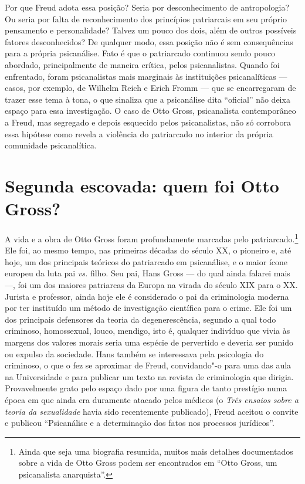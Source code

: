Por que Freud adota essa posição? Seria por desconhecimento de
antropologia? Ou seria por falta de reconhecimento dos princípios
patriarcais em seu próprio pensamento e personalidade? Talvez um pouco
dos dois, além de outros possíveis fatores desconhecidos? De qualquer
modo, essa posição não é sem consequências para a própria psicanálise.
Fato é que o patriarcado continuou sendo pouco abordado, principalmente
de maneira crítica, pelos psicanalistas. Quando foi enfrentado, foram
psicanalistas mais marginais às instituições psicanalíticas --- casos,
por exemplo, de Wilhelm Reich e Erich Fromm --- que se encarregaram de
trazer esse tema à tona, o que sinaliza que a psicanálise dita
``oficial'' não deixa espaço para essa investigação. O caso de Otto
Gross, psicanalista contemporâneo a Freud, mas segregado e depois
esquecido pelos psicanalistas, não só corrobora essa hipótese como
revela a violência do patriarcado no interior da própria comunidade
psicanalítica.

\section{Segunda escovada: quem foi Otto Gross? }

A vida e a obra de Otto Gross foram profundamente marcadas pelo
patriarcado.\footnote{Ainda que seja uma biografia resumida, muitos mais
  detalhes documentados sobre a vida de Otto Gross podem ser encontrados
  em ``Otto Gross, um psicanalista anarquista''.} Ele foi, ao mesmo
tempo, nas primeiras décadas do século XX, o pioneiro e, até hoje, um
dos principais teóricos do patriarcado em psicanálise, e o maior ícone
europeu da luta pai \emph{vs.} filho. Seu pai, Hans Gross --- do qual
ainda falarei mais ---, foi um dos maiores patriarcas da Europa na virada
do século XIX para o XX. Jurista e professor, ainda hoje ele é
considerado o pai da criminologia moderna por ter instituído um método
de investigação científica para o crime. Ele foi um dos principais
defensores da teoria da degenerescência, segundo a qual todo criminoso,
homossexual, louco, mendigo, isto é, qualquer indivíduo que vivia às
margens dos valores morais seria uma espécie de pervertido e deveria ser
punido ou expulso da sociedade. Hans também se interessava pela
psicologia do criminoso, o que o fez se aproximar de Freud, convidando"-o
para uma das aula na Universidade e para publicar um texto na revista de
criminologia que dirigia. Provavelmente grato pelo espaço dado por uma
figura de tanto prestígio numa época em que ainda era duramente atacado
pelos médicos (o \emph{Três ensaios sobre a teoria da sexualidade} havia
sido recentemente publicado), Freud aceitou o convite e publicou
``Psicanálise e a determinação dos fatos nos processos jurídicos''.

